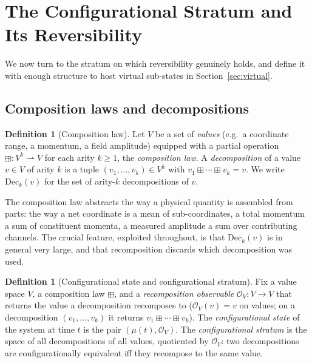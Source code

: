 \documentclass[11pt,a4paper]{article}
\theoremstyle{thmstyle}
\theoremstyle{definition}
\newtheorem{definition}[theorem]{Definition}
\theoremstyle{remark}
\newcommand{\Mic}{\mu}
\newcommand{\Obs}{\mathcal{O}}
\begin{document}
\section{The Configurational Stratum and Its Reversibility}
\label{sec:reversible}

We now turn to the stratum on which reversibility genuinely holds, and
define it with enough structure to host virtual sub-states in
Section~\ref{sec:virtual}.

\subsection{Composition laws and decompositions}
\label{sec:composition}

\begin{definition}[Composition law]
\label{def:complaw}
Let $V$ be a set of \emph{values} (e.g.\ a coordinate range, a momentum, a
field amplitude) equipped with a partial operation
$\boxplus\colon V^k\rightharpoonup V$ for each arity $k\geq 1$, the
\emph{composition law}. A \emph{decomposition} of a value $v\in V$ of
arity $k$ is a tuple $(v_1,\dots,v_k)\in V^k$ with
$v_1\boxplus\cdots\boxplus v_k=v$. We write $\mathrm{Dec}_k(v)$ for the set
of arity-$k$ decompositions of $v$.
\end{definition}

The composition law abstracts the way a physical quantity is assembled
from parts: the way a net coordinate is a mean of sub-coordinates, a total
momentum a sum of constituent momenta, a measured amplitude a sum over
contributing channels. The crucial feature, exploited throughout, is that
$\mathrm{Dec}_k(v)$ is in general very large, and that recomposition
discards which decomposition was used.

\begin{definition}[Configurational state and configurational stratum]
\label{def:configstratum}
Fix a value space $V$, a composition law $\boxplus$, and a
\emph{recomposition observable} $\Obs_V\colon V\to V$ that returns the
value a decomposition recomposes to ($\Obs_V(v)=v$ on values; on a
decomposition $(v_1,\dots,v_k)$ it returns $v_1\boxplus\cdots\boxplus
v_k$). The \emph{configurational state} of the system at time $t$ is the
pair $(\Mic(t),\Obs_V)$. The \emph{configurational stratum} is the space
of all decompositions of all values, quotiented by $\Obs_V$: two
decompositions are configurationally equivalent iff they recompose to the
same value.
\end{definition}
\end{document}
